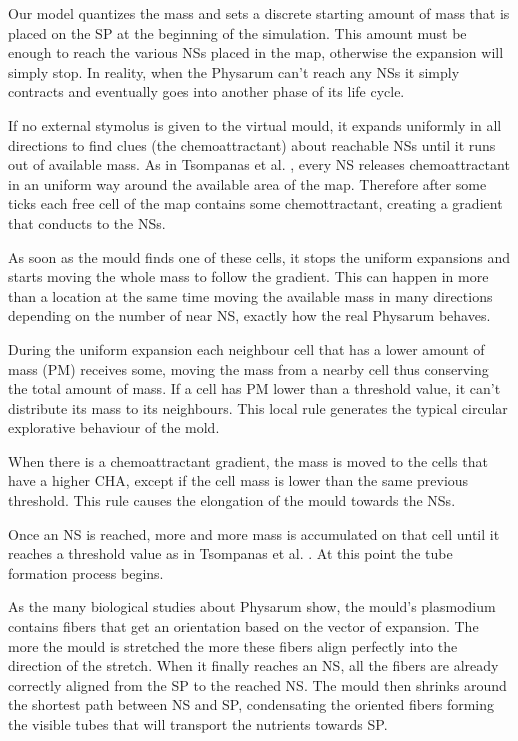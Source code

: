 \par
Our model quantizes the mass and sets a discrete starting amount of mass that is placed on the SP at the beginning of the simulation. This amount must be enough to reach the various NSs placed in the map, otherwise the expansion will simply stop. In reality, when the Physarum can't reach any NSs it simply contracts and eventually goes into another phase of its life cycle.

\par
If no external stymolus is given to the virtual mould, it expands uniformly in all directions to find clues (the chemoattractant) about reachable NSs until it runs out of available mass. As in Tsompanas et al. \cite{Tsompanas2016}, every NS releases chemoattractant in an uniform way around the available area of the map. Therefore after some ticks each free cell of the map contains some chemottractant, creating a gradient that conducts to the NSs.

\par
As soon as the mould finds one of these cells, it stops the uniform expansions and starts moving the whole mass to follow the gradient. This can happen in more than a location at the same time moving the available mass in many directions depending on the number of near NS, exactly how the real Physarum behaves.

\par
During the uniform expansion each neighbour cell that has a lower amount of mass (PM) receives some, moving the mass from a nearby cell thus conserving the total amount of mass. If a cell has PM lower than a threshold value, it can't distribute its mass to its neighbours. This local rule generates the typical circular explorative behaviour of the mold.

\par 
When there is a chemoattractant gradient, the mass is moved to the cells that have a higher CHA, except if the cell mass is lower than the same previous threshold. This rule causes the elongation of the mould towards the NSs.

\par
Once an NS is reached, more and more mass is accumulated on that cell until it reaches a threshold value as in Tsompanas et al. \cite{Tsompanas2016}. At this point the tube formation process begins.

\par
As the many biological studies about Physarum show, the mould's plasmodium contains fibers that get an orientation based on the vector of expansion. The more the mould is stretched the more these fibers align perfectly into the direction of the stretch. When it finally reaches an NS, all the fibers are already correctly aligned from the SP to the reached NS. The mould then shrinks around the shortest path between NS and SP, condensating the oriented fibers forming the visible tubes that will transport the nutrients towards SP.

